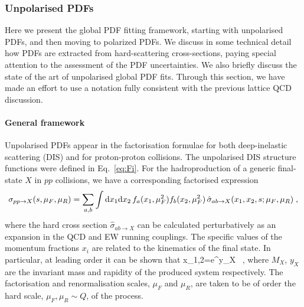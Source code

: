 \subsubsection{Unpolarised PDFs}
\label{sec:unpPDFs}

Here we present the global PDF fitting framework,
starting with unpolarised PDFs, and then moving to polarized
PDFs.
%
We discuss in some technical detail how PDFs are extracted
from hard-scattering cross-sections, paying special attention
to the assessment of the PDF uncertainties.
%
We also briefly discuss the state of the art of unpolarised
global PDF fits.
%
Through this section,
we have made an effort to use a notation fully consistent
with the previous lattice QCD discussion.

\paragraph{General framework}
%
Unpolarised PDFs appear in the factorisation formulae for both
deep-inelastic scattering (DIS) and for proton-proton collisions.
%
The unpolarised DIS structure functions were defined in Eq.~\eqref{eq:Fi}.
%
For the hadroproduction of a generic final-state $X$ in $pp$ collisions, we have
a corresponding factorised expression
\begin{equation}
  \label{eq:LHCxsec}
\sigma_{pp\to X}(s,\mu_F,\mu_R)=\sum_{a,b}\int {\rm d}x_1 {\rm d}x_2\, f_a(x_1,\mu_F^2)f_b(x_2,\mu_F^2)\,\hat{\sigma}_{ab\to X}(x_1,x_2,s;\mu_{F},\mu_R)\;,
\end{equation}
where the hard cross section $\hat{\sigma}_{ab\to X}$ can
be calculated perturbatively as an expansion in the QCD and EW running couplings.
%
The specific values of the momentum fractions
$x_i$ are related to the kinematics of the final state.
%
In particular, at leading order it can be shown that
\be
x_{1,2}=e^{\pm y_X} \, ,
\ee
where $M_X$, $y_X$ are the invariant mass and rapidity of the produced system respectively.
%
The factorisation and renormalisation scales, $\mu_F$ and $\mu_R$, are taken to be of order the hard scale,
$\mu_F,\mu_R \sim Q$, of the process.

